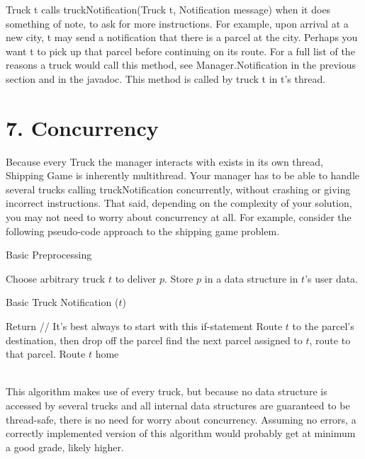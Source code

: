 \documentclass[11pt]{article}
\begin{document}
Truck t calls truckNotification(Truck t, Notification message) when it does something of note, to ask for more instructions. For example, upon arrival at a new city, t may send a notification that there is a parcel at the city. Perhaps you want t to pick up that parcel before continuing on its route. For a full list of the reasons a truck would call this method, see Manager.Notification in the previous section and in the javadoc. This method is called by truck t in t's thread. 

\section{7. Concurrency}
Because every Truck the manager interacts with exists in its own thread, Shipping Game is inherently multithread. Your manager has to be able to handle several trucks calling truckNotification concurrently, without crashing or giving incorrect instructions. That said, depending on the complexity of your solution, you may not need to worry about concurrency at all. For example, consider the following pseudo-code approach to the shipping game problem.
\begin{algorithm}
\caption{Basic Preprocessing} \label{alg:ls}
\begin{algorithmic}[1]
\STATE Choose arbitrary truck $t$ to deliver $p$. Store $p$ in a data structure in $t$'s user data.
\ENDFOR
\end{algorithmic}
\end{algorithm}
\begin{algorithm}
\caption{Basic Truck Notification ($t$)} \label{alg:ls}
\begin{algorithmic}[1]
\STATE Return      // It's best always to start with this if-statement
\ENDIF
{}
\STATE Route $t$ to the parcel's destination, then drop off the parcel
\ELSE
\STATE find the next parcel assigned to $t$, route to that parcel.
\ENDIF
\ELSE
\STATE Route $t$ home
\ENDIF
\end{algorithmic}
\end{algorithm}
\\

This algorithm makes use of every truck, but because no data structure is accessed by several trucks and all internal data structures are guaranteed to be thread-safe, there is no need for worry about concurrency. Assuming no errors, a correctly implemented version of this algorithm  would probably get at minimum a good grade, likely higher.\\
\end{document}

